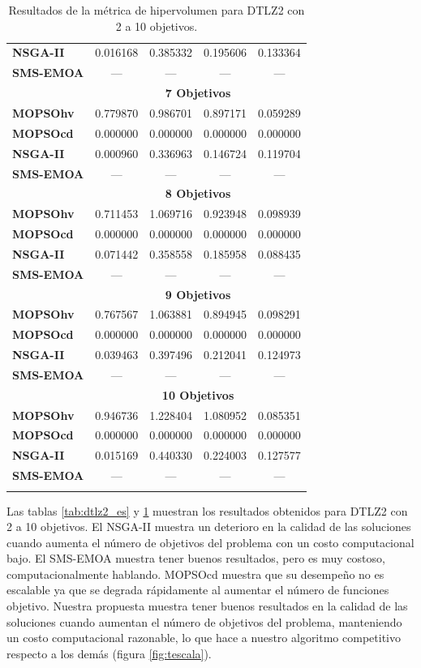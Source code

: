 \begin{longtable}{|l|cc|cc|}
	\textbf{NSGA-II} &0.016168 & 0.385332 & 0.195606 & 0.133364 \\  
	\textbf{SMS-EMOA}& --- & --- & --- & --- \\
	\hline\hline
 & \multicolumn{4}{|c|}{\textbf{7 Objetivos}} \\ 
	\hline\hline
	\textbf{MOPSOhv} &0.779870 & 0.986701 & 0.897171 & 0.059289 \\ 
	\textbf{MOPSOcd} &0.000000 & 0.000000 & 0.000000 & 0.000000 \\ 
	\textbf{NSGA-II} &0.000960 & 0.336963 & 0.146724 & 0.119704 \\  
	\textbf{SMS-EMOA} & --- & --- & --- & --- \\
	\hline\hline
 & \multicolumn{4}{|c|}{\textbf{8 Objetivos}} \\ 
	\hline\hline
	\textbf{MOPSOhv} &0.711453 & 1.069716 & 0.923948 & 0.098939 \\ 
	\textbf{MOPSOcd} &0.000000 & 0.000000 & 0.000000 & 0.000000 \\ 
	\textbf{NSGA-II} &0.071442 & 0.358558 & 0.185958 & 0.088435 \\ 
	\textbf{SMS-EMOA} & --- & --- & --- & --- \\
	\hline\hline
 & \multicolumn{4}{|c|}{\textbf{9 Objetivos}} \\ 
	\hline\hline
	\textbf{MOPSOhv} &0.767567 & 1.063881 & 0.894945 & 0.098291 \\ 
	\textbf{MOPSOcd} &0.000000 & 0.000000 & 0.000000 & 0.000000 \\ 
	\textbf{NSGA-II} &0.039463 & 0.397496 & 0.212041 & 0.124973 \\ 
	\textbf{SMS-EMOA} & --- & --- & --- & --- \\
	\hline\hline
 & \multicolumn{4}{|c|}{\textbf{10 Objetivos}} \\ 
	\hline\hline
	\textbf{MOPSOhv} &0.946736 & 1.228404 & 1.080952 & 0.085351   \\ 
	\textbf{MOPSOcd} &0.000000 & 0.000000 & 0.000000 & 0.000000 \\ 
	\textbf{NSGA-II} &0.015169 & 0.440330 & 0.224003 & 0.127577 \\  
	\textbf{SMS-EMOA} & --- & --- & --- & --- \\
	\hline\hline
\caption{Resultados de la m\'etrica de hipervolumen para DTLZ2 con 2 a 10 objetivos.}
  \label{tab:dtlz2_hv}
\end{longtable}

Las tablas \ref{tab:dtlz2_es} y \ref{tab:dtlz2_hv} muestran los resultados obtenidos para 
DTLZ2 con 2 a 10 objetivos. El NSGA-II muestra un deterioro en la 
calidad de las soluciones cuando aumenta el n\'umero de objetivos del problema con un costo 
computacional bajo. El SMS-EMOA muestra tener buenos resultados, pero es muy costoso, computacionalmente hablando. 
MOPSOcd muestra que su desempe\~no no es escalable ya que se degrada r\'apidamente al aumentar el n\'umero de 
funciones objetivo. Nuestra propuesta  muestra tener buenos resultados en la
calidad de las soluciones cuando aumentan el n\'umero de objetivos del problema, manteniendo un costo
computacional razonable, lo que hace a nuestro algoritmo competitivo respecto a los dem\'as (figura \ref{fig:tescala}).

